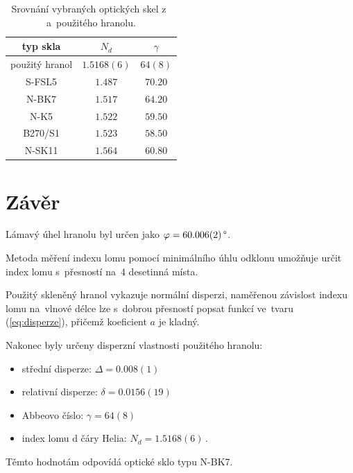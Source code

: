 \documentclass{../concepts/titul_protokol_p/prepareprotokol} %
\begin{document}
\begin{table}[!htbp]
\centering
\caption{Srovnání vybraných optických skel z~\cite{edmund} a~použitého
hranolu.}
\begin{tabular}{ccc}
 \toprule
 typ skla & $N_d$ & $\gamma$ \\
 \midrule
 použitý hranol & $1.5168(6)$ & $64(8)$ \\
 S-FSL5 & $1.487$ & $70.20$ \\
 N-BK7 & $1.517$ & $64.20$ \\
 N-K5 & $1.522$ & $59.50$ \\
 B270/S1 & $1.523$ & $58.50$ \\
 N-SK11 & $1.564$ & $60.80$ \\
 \bottomrule
\end{tabular}
\label{tab:srovnani}
\end{table}

\section{Závěr}

Lámavý úhel hranolu byl určen jako $\varphi = 60.006(2) \,\degree$.

Metoda měření indexu lomu pomocí minimálního úhlu odklonu umožňuje
určit index lomu s~přesností na~4 desetinná místa.

Použitý skleněný hranol vykazuje normální disperzi, naměřenou
závislost indexu lomu na~vlnové délce lze s~dobrou přesností
popsat funkcí ve~tvaru (\ref{eq:disperze}), přičemž koeficient $a$ je kladný.

Nakonec byly určeny disperzní vlastnosti použitého hranolu:
\begin{itemize}
    \item střední disperze: $\Delta = 0.008(1)$
    \item relativní disperze: $\delta = 0.0156(19)$
    \item Abbeovo číslo: $\gamma = 64(8)$
    \item index lomu d čáry Helia: $N_d = 1.5168(6)$\,.
\end{itemize}
Těmto hodnotám odpovídá optické sklo typu N-BK7.
\end{document}
